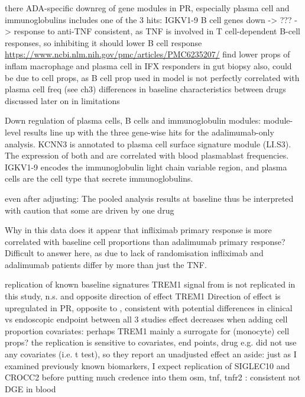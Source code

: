 \begin{outline}
\1 there ADA-specific downreg of gene modules in PR, especially plasma cell and immunoglobulins
    \2 includes one of the 3 hits: IGKV1-9
    \2 B cell genes down -> ??? -> response to anti-TNF
        \3 consistent, as TNF is involved in T cell-dependent B-cell responses, so inhibiting it should lower B cell response \url{https://www.ncbi.nlm.nih.gov/pmc/articles/PMC6235207/}
    \2 \textcite{gaujoux2019CellcentredMetaanalysisReveals} find lower props of inflam macrophage and plasma cell in IFX responders in gut biopsy
    \2 also, could be due to cell props, as B cell prop used in model is not perfectly correlated with plasma cell freq (see ch3)
    \2 differences in baseline characteristics between drugs discussed later on in limitations

Down regulation of plasma cells, B cells and immunoglobulin modules: module-level results line up with the three gene-wise hits for the adalimumab-only analysis.
KCNN3 is annotated to plasma cell surface signature module (LI.S3).
The expression of both  and  are correlated with blood plasmablast frequencies\autocite{tsang2014GlobalAnalysesHuman}.
IGKV1-9 encodes the immunoglobulin light chain variable region, and plasma cells are the cell type that secrete immunoglobulins.

even after adjusting: The pooled analysis results at baseline thus be interpreted with caution that some are driven by one drug

Why in this data does it appear that infliximab primary response is more correlated with baseline cell proportions than adalimumab primary response?
Difficult to answer here, as due to lack of randomisation infliximab and adalimumab patients differ by more than just the \gls{TNF}.

\1 replication of known baseline signatures
    \2 TREM1 signal from \textcite{verstockt2019LowTREM1Expression} is not replicated in this study, n.s. and opposite direction of effect
    \2 TREM1 Direction of effect is upregulated in PR, opposite to \autocite{verstockt2019LowTREM1Expression}, consistent with \autocite{gaujoux2019CellcentredMetaanalysisReveals}
    \2 potential differences in clinical vs endoscopic endpoint between all 3 studies
    \2 effect decreases when adding cell proportion covariates: perhaps TREM1 mainly a surrogate for (monocyte) cell props?
    \2 the replication is sensitive to covariates, end points, drug
        \3 e.g. \textcite{verstockt2019LowTREM1Expression} did not use any covariates (i.e. t test), so they report an unadjusted effect
    \2 an aside: just as I examined previously known biomarkers, I expect replication of SIGLEC10 and CROCC2 before putting much credence into them
    \2 osm, tnf, tnfr2 \autocite{verstockt2019LowTREM1Expression}: consistent not DGE in blood


\end{outline}
